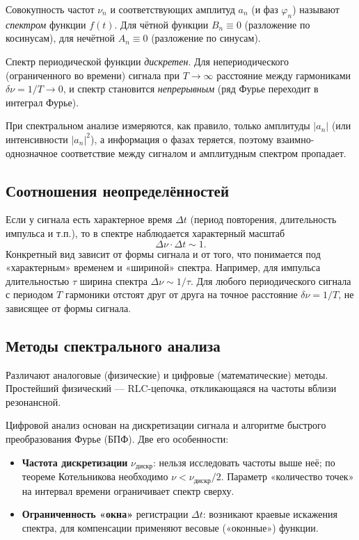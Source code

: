 \documentclass[a4paper,10pt]{article}
\begin{document}
Совокупность частот $\nu_n$ и соответствующих амплитуд $a_n$ (и фаз $\varphi_n$) называют \emph{спектром} функции $f(t)$. Для чётной функции $B_n \equiv 0$ (разложение по косинусам), для нечётной $A_n \equiv 0$ (разложение по синусам).

Спектр периодической функции \emph{дискретен}. Для непериодического (ограниченного во времени) сигнала при $T \to \infty$ расстояние между гармониками $\delta\nu = 1/T \to 0$, и спектр становится \emph{непрерывным} (ряд Фурье переходит в интеграл Фурье).

При спектральном анализе измеряются, как правило, только амплитуды $|a_n|$ (или интенсивности $|a_n|^2$), а информация о фазах теряется, поэтому взаимно-однозначное соответствие между сигналом и амплитудным спектром пропадает.

\subsection*{Соотношения неопределённостей}

Если у сигнала есть характерное время $\Delta t$ (период повторения, длительность импульса и т.п.), то в спектре наблюдается характерный масштаб
\begin{equation}
\Delta\nu \cdot \Delta t \sim 1.
\end{equation}
Конкретный вид зависит от формы сигнала и от того, что понимается под «характерным» временем и «шириной» спектра. Например, для импульса длительностью $\tau$ ширина спектра $\Delta\nu \sim 1/\tau$. Для любого периодического сигнала с периодом $T$ гармоники отстоят друг от друга на точное расстояние $\delta\nu = 1/T$, не зависящее от формы сигнала.

\subsection*{Методы спектрального анализа}

Различают аналоговые (физические) и цифровые (математические) методы. Простейший физический  --- RLC-цепочка, откликающаяся на частоты вблизи резонансной.

Цифровой анализ основан на дискретизации сигнала и алгоритме быстрого преобразования Фурье (БПФ). Две его особенности:
\begin{itemize}
\item \textbf{Частота дискретизации} $\nu_{\text{дискр}}$: нельзя исследовать частоты выше неё; по теореме Котельникова необходимо $\nu < \nu_{\text{дискр}}/2$. Параметр «количество точек» на интервал времени ограничивает спектр сверху.
\item \textbf{Ограниченность «окна»} регистрации $\Delta t$: возникают краевые искажения спектра, для компенсации применяют весовые («оконные») функции. 
\end{itemize}
\end{document}
